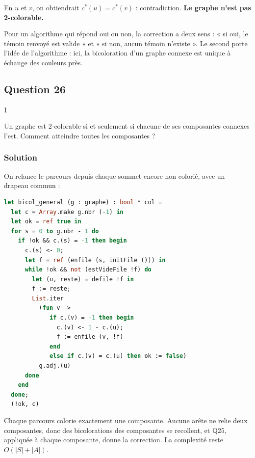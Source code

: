 \documentclass[11pt,a4paper]{article}
\begin{document}
En \(u\) et \(v\), on obtiendrait \(c^*(u) = c^*(v)\) : contradiction. \textbf{Le graphe n'est pas 2-colorable.}

\begin{methode}

Pour un algorithme qui répond oui ou non, la correction a deux sens : « si oui, le témoin renvoyé est valide » et « si non, aucun témoin n'existe ». Le second porte l'idée de l'algorithme : ici, la bicoloration d'un graphe connexe est unique à échange des couleurs près.

\end{methode}

\hypertarget{question-26}{%
\subsection{Question 26}\label{question-26}}

\begin{indication}{1}

Un graphe est 2-colorable si et seulement si chacune de ses composantes connexes l'est. Comment atteindre toutes les composantes ?

\end{indication}

\hypertarget{solution-25}{%
\subsubsection{Solution}\label{solution-25}}

On relance le parcours depuis chaque sommet encore non colorié, avec un drapeau commun :

\begin{lstlisting}[language=Caml]
let bicol_general (g : graphe) : bool * col =
  let c = Array.make g.nbr (-1) in
  let ok = ref true in
  for s = 0 to g.nbr - 1 do
    if !ok && c.(s) = -1 then begin
      c.(s) <- 0;
      let f = ref (enfile (s, initFile ())) in
      while !ok && not (estVideFile !f) do
        let (u, reste) = defile !f in
        f := reste;
        List.iter
          (fun v ->
             if c.(v) = -1 then begin
               c.(v) <- 1 - c.(u);
               f := enfile (v, !f)
             end
             else if c.(v) = c.(u) then ok := false)
          g.adj.(u)
      done
    end
  done;
  (!ok, c)
\end{lstlisting}

Chaque parcours colorie exactement une composante. Aucune arête ne relie deux composantes, donc des bicolorations des composantes se recollent, et Q25, appliquée à chaque composante, donne la correction. La complexité reste \(O(|S| + |A|)\).
\end{document}
